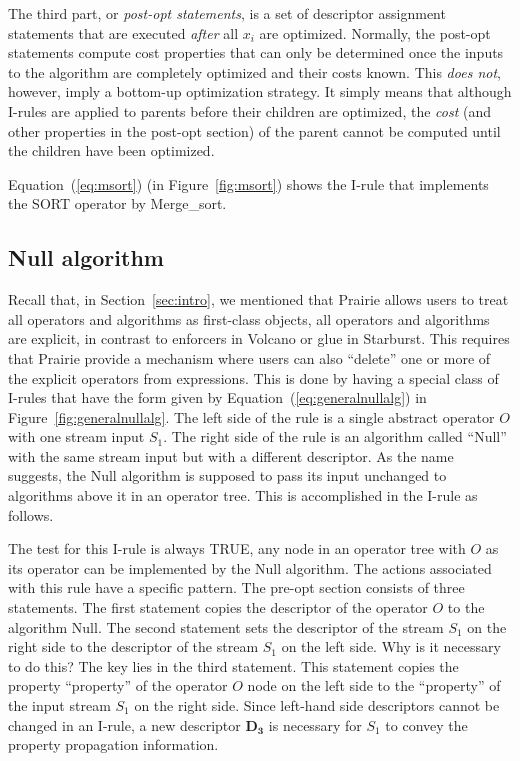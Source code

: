 The third part, or \emph{post-opt statements}, is a set of descriptor
assignment statements that are executed \emph{after} all $x_i$ are
optimized.  Normally, the post-opt statements compute cost properties
that can only be determined once the inputs to the algorithm are
completely optimized and their costs known.  This \emph{does not},
however, imply a bottom-up optimization strategy.  It simply means that
although I-rules are applied to parents before their children are
optimized, the \emph{cost} (and other properties in the post-opt
section) of the parent cannot be computed until the children have been
optimized.

\begin{example}
\label{ex:mergesort}
Equation~(\ref{eq:msort}) (in Figure~\ref{fig:msort}) shows the I-rule
that implements the SORT operator by Merge\_sort.
\end{example}

\subsection{Null algorithm}
\label{sec:null}
Recall that, in Section~\ref{sec:intro}, we mentioned that Prairie
allows users to treat all operators and algorithms as first-class
objects, \ie all operators and algorithms are explicit, in contrast to
enforcers in Volcano or glue in Starburst.  This requires that Prairie
provide a mechanism where users can also ``delete'' one or more of the
explicit operators from expressions.  This is done by having a special
class of I-rules that have the form given by
Equation~(\ref{eq:generalnullalg}) in Figure~\ref{fig:generalnullalg}.
The left side of the rule is a single abstract operator $O$ with one
stream input $S_1$.  The right side of the rule is an algorithm called
``Null'' with the same stream input but with a different descriptor.
As the name suggests, the Null algorithm is supposed to pass its input
unchanged to algorithms above it in an operator tree.  This is
accomplished in the I-rule as follows.

The test for this I-rule is always TRUE, \ie any node in an operator
tree with $O$ as its operator can be implemented by the Null
algorithm.  The actions associated with this rule have a specific
pattern.  The pre-opt section consists of three
statements.  The first statement copies the descriptor of the operator
$O$ to the algorithm Null.  The second statement sets the descriptor of
the stream $S_1$ on the right side to the descriptor of the stream
$S_1$ on the left side.  Why is it necessary to do this?  The key lies
in the third statement.  This statement copies the property
``property'' of the operator $O$ node on the left side to the
``property'' of the input stream $S_1$ on the right side.  Since
left-hand side descriptors cannot be changed in an I-rule, a new
descriptor $\mathbf{D_3}$ is necessary for $S_1$ to convey the property
propagation information.

